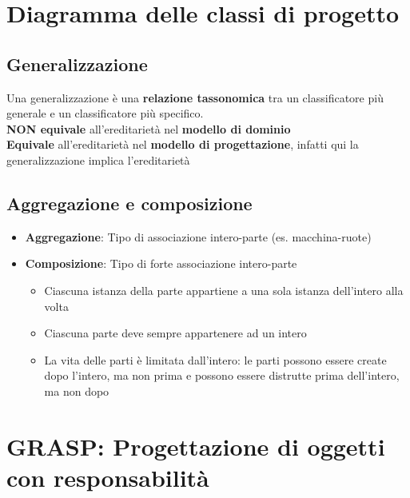 \documentclass[12pt]{article}
\begin{document}
\section{Diagramma delle classi di progetto}
\subsection{Generalizzazione}
Una generalizzazione è una \textbf{relazione tassonomica} tra un classificatore più generale e un classificatore più specifico. 
\\\textbf{NON equivale} all'ereditarietà nel \textbf{modello di dominio}
\\\textbf{Equivale} all'ereditarietà nel \textbf{modello di progettazione}, infatti qui la generalizzazione implica l'ereditarietà

\subsection{Aggregazione e composizione}
\begin{itemize}
    \item \textbf{Aggregazione}: Tipo di associazione intero-parte (es. macchina-ruote)
    \item \textbf{Composizione}: Tipo di forte associazione intero-parte
    \begin{itemize}
        \item Ciascuna istanza della parte appartiene a una sola istanza dell'intero alla volta
        \item Ciascuna parte deve sempre appartenere ad un intero
        \item La vita delle parti è limitata dall'intero: le parti possono essere create dopo l'intero, ma non prima e possono essere distrutte prima dell'intero, ma non dopo
    \end{itemize}
\end{itemize}
\section{GRASP: Progettazione di oggetti con responsabilità}
\end{document}
